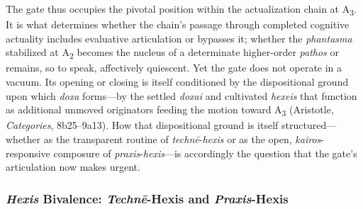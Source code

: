 \documentclass{article}
\begin{document}
The gate thus occupies the pivotal position within the actualization chain at A\textsubscript{3}. It is what determines whether the chain's passage through completed cognitive actuality includes evaluative articulation or bypasses it; whether the \textit{phantasma} stabilized at A\textsubscript{2} becomes the nucleus of a determinate higher-order \textit{pathos} or remains, so to speak, affectively quiescent. Yet the gate does not operate in a vacuum. Its opening or closing is itself conditioned by the dispositional ground upon which \textit{doxa} forms---by the settled \textit{doxai} and cultivated \textit{hexeis} that function as additional unmoved originators feeding the motion toward A\textsubscript{3} (Aristotle, \textit{Categories}, 8b25--9a13). How that dispositional ground is itself structured---whether as the transparent routine of \textit{technē}-\textit{hexis} or as the open, \textit{kairos}-responsive composure of \textit{praxis}-\textit{hexis}---is accordingly the question that the gate's articulation now makes urgent.


\subsubsection*{\textit{Hexis} Bivalence: \textit{Techn\=e}-Hexis and \textit{Praxis}-Hexis}
\end{document}
